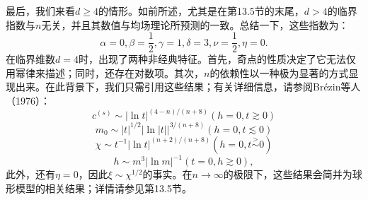 最后，我们来看\(d \geq 4\)的情形。如前所述，尤其是在第13.5节的末尾，\(d > 4\)的临界指数与\(n\)无关，并且其数值与均场理论所预测的一致。总结一下，这些指数为：
\begin{equation}\tag{13.7.6}\label{eq:13.7.6}
\alpha = 0 ,  \beta = \frac { 1 } { 2 } ,  \gamma = 1 ,  \delta = 3 ,  \nu = \frac { 1 } { 2 } ,  \eta = 0 .
\end{equation}
在临界维数\(d=4\)时，出现了两种非经典特征。首先，奇点的性质决定了它无法仅用幂律来描述；同时，还存在对数项。其次，\(n\)的依赖性以一种极为显著的方式显现出来。在此背景下，我们只需引用这些结果；有关详细信息，请参阅Brézin等人（1976）：
\begin{equation}\tag{13.7.7}\label{eq:13.7.7}
c ^{( s )} \sim | \ln t | ^{( 4 - n ) / ( n + 8 )}   ( h = 0 , t \gtrsim 0 )
\end{equation}
\begin{equation}\tag{13.7.8}\label{eq:13.7.8}
m _ { 0 } \sim | t | ^{1 / 2} | \ln | t | | ^{3 / ( n + 8 )}  ( h = 0 , t \lesssim 0 )
\end{equation}
\begin{equation}\tag{13.7.9}\label{eq:13.7.9}
\chi \sim t ^{- 1} | \ln t | ^{( n + 2 ) / ( n + 8 )}  ( h = 0 , t \stackrel { > } { \sim } 0 )
\end{equation}
\begin{equation}\tag{13.7.10}\label{eq:13.7.10}
h \sim m ^{3} | \ln m | ^{- 1}         ( t = 0 , h \gtrsim 0 ) ,
\end{equation}
此外，还有\(\eta=0\)，因此\(\xi\sim\chi^{1/2}\)的事实。在\(n\to\infty\)的极限下，这些结果会简并为球形模型的相关结果；详情请参见第13.5节。
